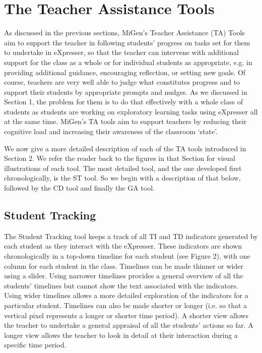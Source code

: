 
\section{The Teacher Assistance Tools}
\label{sec:teach-assist-tools}

As discussed in the previous sections, MiGen’s Teacher Assistance (TA)
Tools aim to support the teacher in following students' progress on
tasks set for them to undertake in eXpresser, so that the teacher can
intervene with additional support for the class as a whole or for
individual students as appropriate, e.g. in providing additional
guidance, encouraging reflection, or setting new goals. Of course,
teachers are very well able to judge what constitutes progress and to
support their students by appropriate prompts and nudges. As we
discussed in Section 1, the problem for them is to do that effectively
with a whole class of students as students are working on exploratory
learning tasks using eXpresser all at the same time. MiGen's TA tools
aim to support teachers by reducing their cognitive load and
increasing their awareness of the classroom `state’.
 
We now give a more detailed description of each of the TA tools
introduced in Section 2. We refer the reader back to the figures in
that Section for visual illustrations of each tool. The most detailed
tool, and the one developed first chronologically, is the ST tool. So
we begin with a description of that below, followed by the CD tool and
finally the GA tool.

\subsection{Student Tracking}
\label{sec:student-tracking}

The Student Tracking tool keeps a track of all TI and TD indicators
generated by each student as they interact with the eXpresser. These
indicators are shown chronologically in a top-down timeline for each
student (see Figure 2), with one column for each student in the
class. Timelines can be made thinner or wider using a slider. Using
narrower timelines provides a general overview of all the students’
timelines but cannot show the text associated with the
indicators. Using wider timelines allows a more detailed exploration
of the indicators for a particular student. Timelines can also be made
shorter or longer (i.e. so that a vertical pixel represents a longer
or shorter time period). A shorter view allows the teacher to
undertake a general appraisal of all the students' actions so far. A
longer view allows the teacher to look in detail at their interaction
during a specific time period.
 
